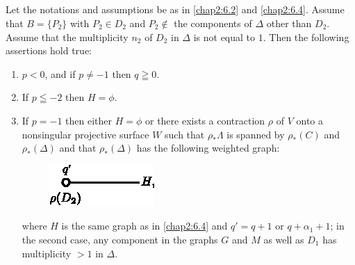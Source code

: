 \subsection{}\label{chap2:6.6}
\begin{lemma*}
  Let the notations and assumptions be as in \ref{chap2:6.2} and
  \ref{chap2:6.4}. Assume that $B=\{P_{2}\}$ with $P_{2}\in D_{2}$ and
  $P_{2}\not\in$ the components of $\Delta$ other than $D_{2}$. Assume
  that the multiplicity $n_{2}$ of $D_{2}$ in $\Delta$ is not equal to
  $1$. Then the following assertions hold true:
  \begin{enumerate}
    \renewcommand{\labelenumi}{\rm(\theenumi)}
  \item $p<0$, and if $p\neq -1$ then $q\geqq 0$.
    
  \item If $p\leqq -2$ then $H=\phi$.
    
  \item If $p=-1$ then either $H=\phi$ or there exists a contraction
    $\rho$ of $V$ onto a nonsingular projective surface $W$ such that
    $\rho_{\ast}\Lambda$ is spanned by $\rho_{\ast}(C)$ and
    $\rho_{\ast}(\Delta)$ and that $\rho_{\ast}(\Delta)$ has the
    following weighted graph:
    \begin{figure}[H]
      \centering
      \includegraphics[scale=1.5]{figures/chap2-fig18.eps}
    \end{figure}
    \noindent
    where $H$ is the same graph as in \ref{chap2:6.4} and $q'=q+1$ or
    $q+\alpha_{1}+1$; in the second case, any component in the graphs $G$
    and $M$ as well as $D_{1}$ has multiplicity $>1$ in $\Delta$.
  \end{enumerate}
\end{lemma*}

